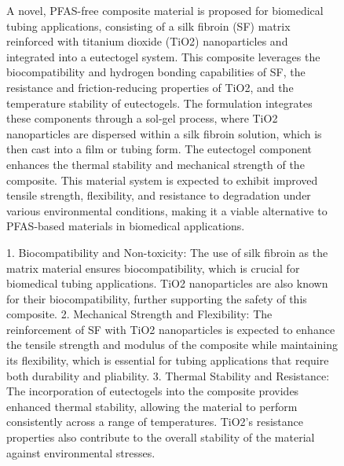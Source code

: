 \begin{figure}[htbp]
  \begin{mdframed}[
    frametitle={Generated Hypothesis as a Result of Breadth-First Search (BFS) with Semantic Stop 'Silk'},
    frametitlefont=\bfseries\sffamily\small,
    backgroundcolor=white,
    linecolor=black,
    linewidth=0.5pt,
    innerleftmargin=6pt,
    innerrightmargin=6pt,
    innertopmargin=6pt,
    innerbottommargin=6pt
  ]
    \ttfamily\scriptsize
    
    \textbf{}
    
    A novel, PFAS-free composite material is proposed for biomedical tubing applications, consisting of a silk fibroin (SF) matrix reinforced with titanium dioxide (TiO2) nanoparticles and integrated into a eutectogel system. This composite leverages the biocompatibility and hydrogen bonding capabilities of SF, the resistance and friction-reducing properties of TiO2, and the temperature stability of eutectogels. The formulation integrates these components through a sol-gel process, where TiO2 nanoparticles are dispersed within a silk fibroin solution, which is then cast into a film or tubing form. The eutectogel component enhances the thermal stability and mechanical strength of the composite. This material system is expected to exhibit improved tensile strength, flexibility, and resistance to degradation under various environmental conditions, making it a viable alternative to PFAS-based materials in biomedical applications.
    
    \textbf{}
    
    1. Biocompatibility and Non-toxicity: The use of silk fibroin as the matrix material ensures biocompatibility, which is crucial for biomedical tubing applications. TiO2 nanoparticles are also known for their biocompatibility, further supporting the safety of this composite.
    2. Mechanical Strength and Flexibility: The reinforcement of SF with TiO2 nanoparticles is expected to enhance the tensile strength and modulus of the composite while maintaining its flexibility, which is essential for tubing applications that require both durability and pliability.
    3. Thermal Stability and Resistance: The incorporation of eutectogels into the composite provides enhanced thermal stability, allowing the material to perform consistently across a range of temperatures. TiO2's resistance properties also contribute to the overall stability of the material against environmental stresses.
    

\end{mdframed}
\end{figure}
